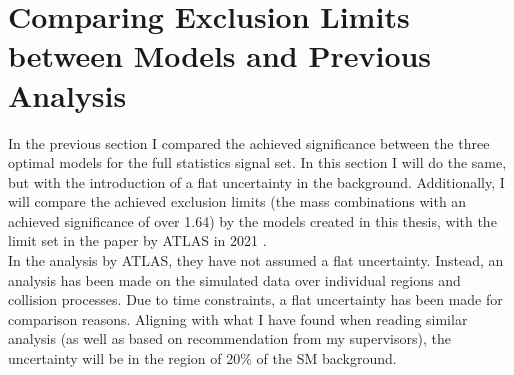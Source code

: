 \section{Comparing Exclusion Limits between Models and Previous Analysis}
In the previous section I compared the achieved significance between 
the three optimal models for the full statistics signal set. In this section 
I will do the same, but with the introduction of a flat uncertainty in the background.
Additionally, I will compare the achieved exclusion limits (the mass combinations with an achieved 
significance of over 1.64) by the models created in this thesis, with the limit set in the paper by \ac{ATLAS} 
in 2021 \cite{atlas_search_2021}.
\\
In the analysis by \ac{ATLAS}, they have not assumed a flat uncertainty. Instead, an analysis has been made on the simulated data 
over individual regions and collision processes. Due to time constraints, a flat uncertainty has been made for comparison 
reasons. Aligning with what I have found when reading similar analysis (as well as based on recommendation from my supervisors), 
the uncertainty will be in the region of $20\%$ of the \ac{SM} background.\\
